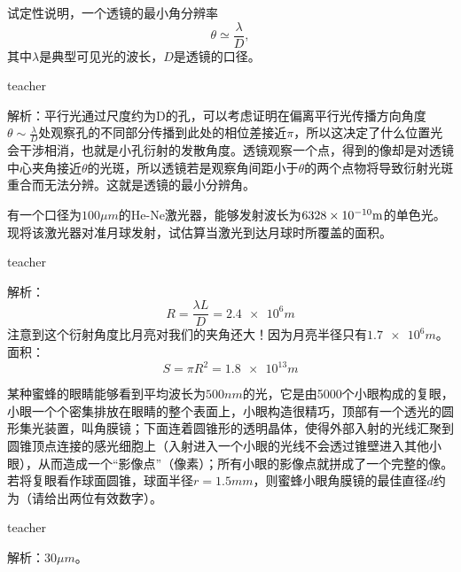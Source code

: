 \begin{example}
试定性说明，一个透镜的最小角分辨率
\[\theta\simeq \frac{\lambda}{D},\]
其中$\lambda$是典型可见光的波长，$D$是透镜的口径。

\begin{taggedblock}{teacher}

解析：平行光通过尺度约为D的孔，可以考虑证明在偏离平行光传播方向角度$\theta \sim \frac{\lambda}{D}$处观察孔的不同部分传播到此处的相位差接近$\pi$，所以这决定了什么位置光会干涉相消，也就是小孔衍射的发散角度。透镜观察一个点，得到的像却是对透镜中心夹角接近$\theta$的光斑，所以透镜若是观察角间距小于$\theta$的两个点物将导致衍射光斑重合而无法分辨。这就是透镜的最小分辨角。
\end{taggedblock}
\end{example}




\begin{example}

有一个口径为$100\unit{\mu m}$的He-Ne激光器，能够发射波长为$6328\times 10^{-10}{\rm{m}}$的单色光。
现将该激光器对准月球发射，试估算当激光到达月球时所覆盖的面积。
\begin{taggedblock}{teacher}

解析：\[R=\frac{\lambda L}{D}=\num{2.4e6}\si{m}\]
注意到这个衍射角度比月亮对我们的夹角还大！因为月亮半径只有$\num{1.7e6}\si{m}$。\\
面积：
\[S=\pi R^2=\num{1.8e13}\si{m}\]
\end{taggedblock}
\end{example}




\begin{example}
某种蜜蜂的眼睛能够看到平均波长为$500\unit{nm}$的光，它是由5000个小眼构成的复眼，小眼一个个密集排放在眼睛的整个表面上，小眼构造很精巧，顶部有一个透光的圆形集光装置，叫角膜镜；下面连着圆锥形的透明晶体，使得外部入射的光线汇聚到圆锥顶点连接的感光细胞上（入射进入一个小眼的光线不会透过锥壁进入其他小眼），从而造成一个“影像点”（像素）；所有小眼的影像点就拼成了一个完整的像。
若将复眼看作球面圆锥，球面半径$r=1.5\unit{mm}$，则蜜蜂小眼角膜镜的最佳直径$d$约为\kong\kong（请给出两位有效数字）。

\begin{taggedblock}{teacher}

解析：$30\unit{\mu m}$。
\end{taggedblock}
\end{example}


